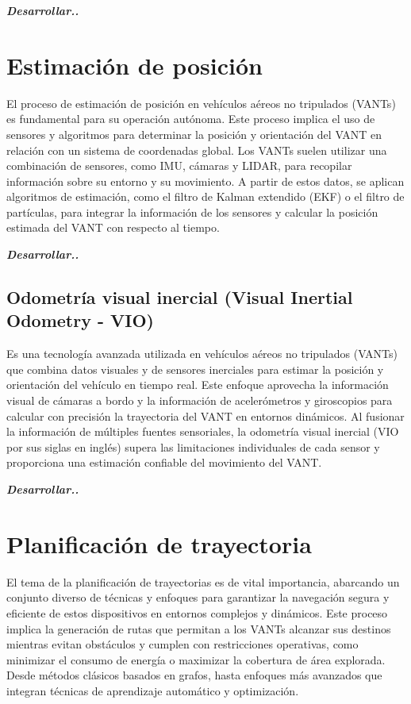 \textit{\textbf{Desarrollar..}}

\section{Estimación de posición}

El proceso de estimación de posición en vehículos aéreos no tripulados (VANTs) es fundamental para su operación autónoma. Este proceso implica el uso de sensores y algoritmos para determinar la posición y orientación del VANT en relación con un sistema de coordenadas global. Los VANTs suelen utilizar una combinación de sensores, como IMU, cámaras y LIDAR, para recopilar información sobre su entorno y su movimiento. A partir de estos datos, se aplican algoritmos de estimación, como el filtro de Kalman extendido (EKF) o el filtro de partículas, para integrar la información de los sensores y calcular la posición estimada del VANT con respecto al tiempo.

\textit{\textbf{Desarrollar..}}

\subsection{Odometría visual inercial (Visual Inertial Odometry - VIO)}

Es una tecnología avanzada utilizada en vehículos aéreos no tripulados (VANTs) que combina datos visuales y de sensores inerciales para estimar la posición y orientación del vehículo en tiempo real. Este enfoque aprovecha la información visual de cámaras a bordo y la información de acelerómetros y giroscopios para calcular con precisión la trayectoria del VANT en entornos dinámicos. Al fusionar la información de múltiples fuentes sensoriales, la odometría visual inercial (VIO por sus siglas en inglés) supera las limitaciones individuales de cada sensor y proporciona una estimación confiable del movimiento del VANT.

\textit{\textbf{Desarrollar..}}

\section{Planificación de trayectoria}

El tema de la planificación de trayectorias es de vital importancia, abarcando un conjunto diverso de técnicas y enfoques para garantizar la navegación segura y eficiente de estos dispositivos en entornos complejos y dinámicos. Este proceso implica la generación de rutas que permitan a los VANTs alcanzar sus destinos mientras evitan obstáculos y cumplen con restricciones operativas, como minimizar el consumo de energía o maximizar la cobertura de área explorada. Desde métodos clásicos basados en grafos, hasta enfoques más avanzados que integran técnicas de aprendizaje automático y optimización.

